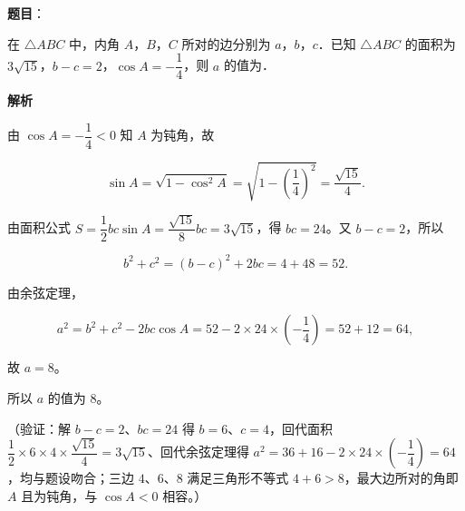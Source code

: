 \begin{answer}

\textbf{题目}：

在 \(\triangle ABC\) 中，内角 \(A\)，\(B\)，\(C\) 所对的边分别为 \(a\)，\(b\)，\(c\)．已知 \(\triangle ABC\) 的面积为 \(3\sqrt{15}\)，\(b-c=2\)，\(\cos A=-\dfrac{1}{4}\)，则 \(a\) 的值为\gkblank{}．

\textbf{解析}

由 \(\cos A=-\dfrac14<0\) 知 \(A\) 为钝角，故

\nopagebreak[4]
\[
\sin A=\sqrt{1-\cos^2A}=\sqrt{1-\left(\dfrac14\right)^2}=\dfrac{\sqrt{15}}4.
\]

由面积公式 \(S=\dfrac12bc\sin A=\dfrac{\sqrt{15}}8bc=3\sqrt{15}\)，得 \(bc=24\)。又 \(b-c=2\)，所以

\nopagebreak[4]
\[
b^2+c^2=(b-c)^2+2bc=4+48=52.
\]

由余弦定理，

\nopagebreak[4]
\[
a^2=b^2+c^2-2bc\cos A=52-2\times24\times\left(-\dfrac14\right)=52+12=64,
\]

故 \(a=8\)。

所以 \(a\) 的值为 \(8\)。

（验证：解 \(b-c=2\)、\(bc=24\) 得 \(b=6\)、\(c=4\)，回代面积 \(\dfrac12\times6\times4\times\dfrac{\sqrt{15}}4=3\sqrt{15}\)、回代余弦定理得 \(a^2=36+16-2\times24\times\left(-\dfrac14\right)=64\)，均与题设吻合；三边 \(4\)、\(6\)、\(8\) 满足三角形不等式 \(4+6>8\)，最大边所对的角即 \(A\) 且为钝角，与 \(\cos A<0\) 相容。）


\end{answer}
